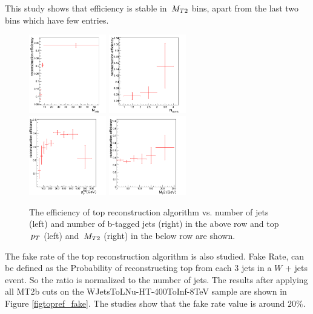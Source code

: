 This study shows that efficiency is stable in $\,{M_{T2}}$ bins, apart from the last two bins which have few entries.

\begin{figure}[htbp] 
\centering
    \includegraphics[width=0.3\textwidth]{figs/topNjet.pdf}
    \includegraphics[width=0.3\textwidth]{figs/topNbjet.pdf} \\
    \includegraphics[width=0.3\textwidth]{figs/topPt.pdf}
    \includegraphics[width=0.3\textwidth]{figs/topMT2.pdf}
    \caption{The efficiency of top reconstruction algorithm vs. number of jets (left) and number of b-tagged jets (right) in the above row and top $\,p_T$ (left) and $\,{M_{T2}}$ (right) in the below row are shown.}
    \label{figtopref_eff}
\end{figure}


The fake rate of the top reconstruction algorithm is also studied. Fake Rate, can be defined as the Probability of reconstructing top from each 3 jets in a $W$ + jets event. So the ratio is normalized to the number of jets. The results after applying all MT2b cuts on the WJetsToLNu-HT-400ToInf-8TeV sample are shown in Figure \ref{figtopref_fake}. The studies show that the fake rate value is around $20\%$.


